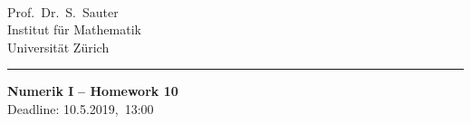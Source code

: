\documentclass[11pt,a4paper,english,hyperref]{article}
\newcommand\blattNummer{10}
\newcommand\abgabeDatum{10.5.2019}
\theoremstyle{break}   %
\begin{document}
\parbox{0ex}{    }   \\
\parbox{25ex}{
  Prof.~Dr.~S.~Sauter\\
  Institut für Mathematik\\
  Universität Zürich
  }
%
\rule[0cm]{0.cm}{.01cm}                  
\hfill  \parbox{0.6\textwidth}{
  {\sf\LARGE\bfseries Numerik I}
  {\sf\Large\bfseries \;\;--\;\; Homework \blattNummer }\\[1.5ex]
  Deadline: \abgabeDatum,\ 13:00
}
\vspace{5ex}
  
\end{document}
